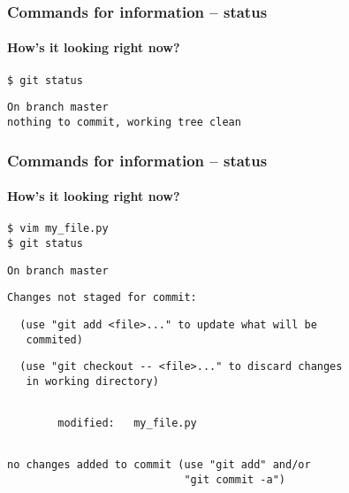 \documentclass{beamer}
\begin{document}
\begin{frame}[fragile]
  \frametitle{Commands for information -- status}
  \framesubtitle{How's it looking right now?}

\begin{verbatim}
$ git status
\end{verbatim}
\pause{}
\begin{verbatim}
On branch master
nothing to commit, working tree clean
\end{verbatim}
\end{frame}

\begin{frame}[fragile]
  \frametitle{Commands for information -- status}
  \framesubtitle{How's it looking right now?}

\begin{verbatim}
$ vim my_file.py
$ git status
\end{verbatim}
\pause{}
\vspace{-3.5ex}
\begin{verbatim}
On branch master
\end{verbatim}
\pause{}
\vspace{-3.5ex}
\begin{verbatim}
Changes not staged for commit:
\end{verbatim}
\pause{}
\vspace{-3.5ex}
\begin{verbatim}
  (use "git add <file>..." to update what will be
   commited)
\end{verbatim}
\pause{}
\vspace{-3.5ex}
\begin{verbatim}
  (use "git checkout -- <file>..." to discard changes
   in working directory)
\end{verbatim}
\pause{}
\vspace{-3.5ex}
\begin{verbatim}

        modified:   my_file.py
\end{verbatim}
\pause{}
\vspace{-3.5ex}
\begin{verbatim}

no changes added to commit (use "git add" and/or
                            "git commit -a")
\end{verbatim}
\end{frame}
\end{document}
